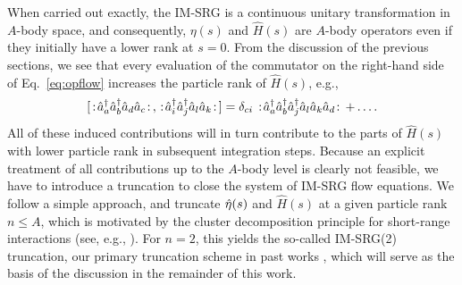 When carried out exactly, the IM-SRG is a continuous unitary transformation in $A$-body space, and consequently, $\eta(s)$ and $\hat{H}(s)$ are $A$-body operators even if they initially have a lower rank at $s=0$. From the discussion of the previous sections, we see that every evaluation of the commutator on the right-hand side of Eq.~\eqref{eq:opflow} increases the particle rank of $\hat{H}(s)$, e.g.,
\begin{equation}\label{eq:induced}
  \comm{\nord{\aaO_{a}\aaO_{b}\aO_{d}\aO_{c}}}{\nord{\aaO_{i}\aaO_{j}\aO_{l}\aO_{k}}}= \delta_{ci}\nord{\aaO_{a}\aaO_{b}\aaO_{j}\aO_{l}\aO_{k}\aO_{d}}+\ldots.
\end{equation}
All of these induced contributions will in turn contribute to the
parts of $\hat{H}(s)$ with lower particle rank in subsequent integration
steps. Because an explicit treatment of all contributions up to the
$A$-body level is clearly not feasible, we have to introduce a
truncation to close the system of IM-SRG flow equations. We follow a
simple approach, and truncate $\hat{\eta}(s)$ and $\hat{H}(s)$ at a given
particle rank $n\leq A$, which is motivated by the cluster
decomposition principle for short-range interactions (see, e.g.,
\cite{weinberg1996}). For $n=2$, this yields the so-called
IM-SRG(2) truncation, our primary truncation scheme in past works
\cite{tsukiyama2011,tsukiyama2012,hergert2013}, which will
serve as the basis of the discussion in the remainder of this work. 

